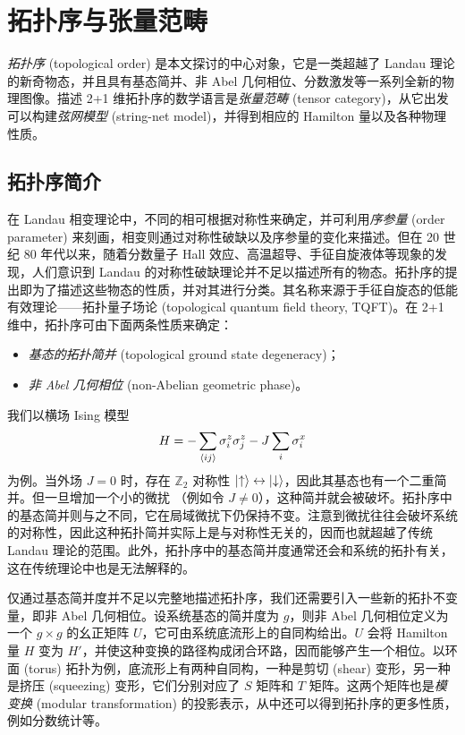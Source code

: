 \chapter{拓扑序与张量范畴}
\label{chap:topological-order}

\emph{拓扑序} (topological order) 是本文探讨的中心对象，它是一类超越了 Landau 理论的新奇物态，并且具有基态简并、非 Abel 几何相位、分数激发等一系列全新的物理图像。描述 2+1 维拓扑序的数学语言是\emph{张量范畴} (tensor category)，从它出发可以构建\emph{弦网模型} (string-net model)，并得到相应的 Hamilton 量以及各种物理性质。

\section{拓扑序简介}
\label{sec:topological-order}

在 Landau 相变理论中，不同的相可根据对称性来确定，并可利用\emph{序参量} (order parameter) 来刻画，相变则通过对称性破缺以及序参量的变化来描述\cite{landau1980statistical,pathria2011statistical}。但在 20 世纪 80 年代以来，随着分数量子 Hall 效应、高温超导、手征自旋液体等现象的发现，人们意识到 Landau 的对称性破缺理论并不足以描述所有的物态。拓扑序的提出即为了描述这些物态的性质，并对其进行分类。其名称来源于手征自旋态的低能有效理论——拓扑量子场论 (topological quantum field theory, TQFT)\cite{witten1989quantum}。在 2+1 维中，拓扑序可由下面两条性质来确定\cite{wen2013topological,zeng2019introduction}：

\begin{itemize}
  \item \emph{基态的拓扑简并} (topological ground state degeneracy)；
  \item \emph{非 Abel 几何相位} (non-Abelian geometric phase)。
\end{itemize}

我们以横场 Ising 模型
\begin{equation}
  H = -\sum_{\ev{ij}} \sigma^z_i\sigma^z_j - J \sum_i \sigma^x_i
\end{equation}
为例。当外场 $J=0$ 时，存在 $\mathbb{Z}_2$ 对称性 $\ket{\uparrow}\leftrightarrow\ket{\downarrow}$，因此其基态也有一个二重简并。但一旦增加一个小的微扰 （例如令 $J\neq0$），这种简并就会被破坏。拓扑序中的基态简并则与之不同，它在局域微扰下仍保持不变。注意到微扰往往会破坏系统的对称性，因此这种拓扑简并实际上是与对称性无关的，因而也就超越了传统 Landau 理论的范围。此外，拓扑序中的基态简并度通常还会和系统的拓扑有关，这在传统理论中也是无法解释的。

仅通过基态简并度并不足以完整地描述拓扑序，我们还需要引入一些新的拓扑不变量，即非 Abel 几何相位。设系统基态的简并度为 $g$，则非 Abel 几何相位定义为一个 $g\times g$ 的幺正矩阵 $U$，它可由系统底流形上的自同构给出。$U$ 会将 Hamilton 量 $H$ 变为 $H'$，并使这种变换的路径构成闭合环路，因而能够产生一个相位。以环面 (torus) 拓扑为例，底流形上有两种自同构，一种是剪切 (shear) 变形，另一种是挤压 (squeezing) 变形，它们分别对应了 $S$ 矩阵和 $T$ 矩阵。这两个矩阵也是\emph{模变换} (modular transformation) 的投影表示，从中还可以得到拓扑序的更多性质，例如分数统计等。


